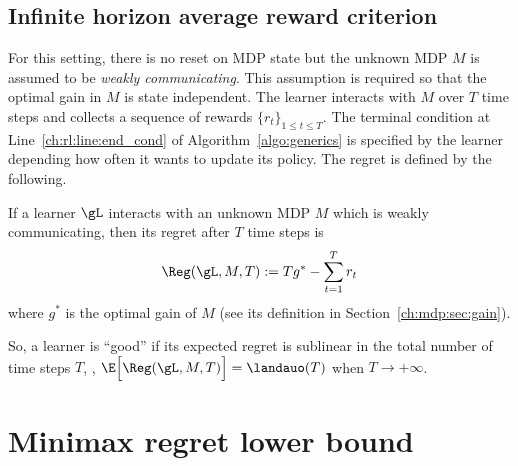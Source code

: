 \subsection{Infinite horizon average reward criterion}
For this setting, there is no reset on MDP state but the unknown MDP $M$ is assumed to be \emph{weakly communicating}.
This assumption is required so that the optimal gain in $M$ is state independent.
The learner interacts with $M$ over $T$ time steps and collects a sequence of rewards $\{r_t\}_{1\le t\le T}$.
The terminal condition at Line~\ref{ch:rl:line:end_cond} of Algorithm~\ref{algo:generics} is specified by the learner depending how often it wants to update its policy.
The regret is defined by the following.
\begin{defn}
    If a learner $\gL$ interacts with an unknown MDP $M$ which is weakly communicating, then its regret after $T$ time steps is
    \begin{equation}
        \label{eq:rg_infinite}
        \Reg(\gL, M, T):= Tg^* -\sum_{t=1}^Tr_t
    \end{equation}
    where $g^*$ is the optimal gain of $M$ (see its definition in Section~\ref{ch:mdp:sec:gain}).
    \label{ch:rl:defn:rg_infinite}
\end{defn}
So, a learner is ``good'' if its expected regret is sublinear in the total number of time steps $T$, \ie, $\E\Big[\Reg(\gL, M, T)\Big]= \landauo(T)$ when $T\to+\infty$.




\section{Minimax regret lower bound}
\label{ch:rl:sec:baseline}

